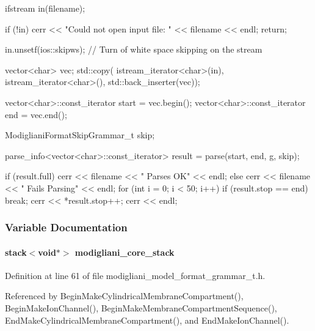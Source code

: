 \begin{DoxyCode}
{
    ifstream in(filename);

    if (!in)
    {
        cerr << "Could not open input file: " << filename << endl;
        return;
    }

    in.unsetf(ios::skipws); //  Turn of white space skipping on the stream

    vector<char> vec;
    std::copy(
        istream_iterator<char>(in),
        istream_iterator<char>(),
        std::back_inserter(vec));

    vector<char>::const_iterator start = vec.begin();
    vector<char>::const_iterator end = vec.end();

        ModiglianiFormatSkipGrammar_t skip;

    parse_info<vector<char>::const_iterator> result =
        parse(start, end, g, skip);

    if (result.full)
        cerr << filename << " Parses OK" << endl;
    else {
        cerr << filename << " Fails Parsing" << endl;
        for (int i = 0; i < 50; i++)
        {
            if (result.stop == end)
                break;
            cerr << *result.stop++;
        }
        cerr << endl;
    }
}
\end{DoxyCode}




\subsubsection{Variable Documentation}
\paragraph[{modigliani\_\-core\_\-stack}]{\setlength{\rightskip}{0pt plus 5cm}stack$<$void$\ast$$>$ {\bf modigliani\_\-core\_\-stack}}\hfill\label{modigliani__model__format__grammar__t_8h_a42bdd986e317ddaa5b9501bcd24803dd}


Definition at line 61 of file modigliani\_\-model\_\-format\_\-grammar\_\-t.h.



Referenced by BeginMakeCylindricalMembraneCompartment(), BeginMakeIonChannel(), BeginMakeMembraneCompartmentSequence(), EndMakeCylindricalMembraneCompartment(), and EndMakeIonChannel().

